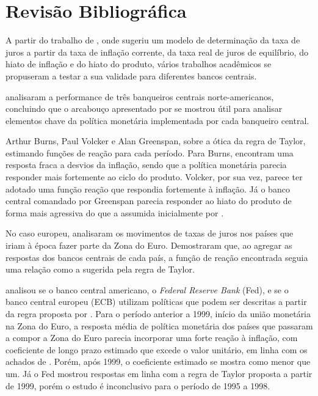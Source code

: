 \documentclass[
	article,			%
	11pt,				%
	oneside,			%
	a4paper,			%
	english,			%
	brazil,				%
	]{abntex2}
\begin{document}
	\section{Revisão Bibliográfica}
	
	A partir do trabalho de , onde sugeriu um modelo de determinação da taxa de juros a partir da taxa de inflação corrente, da taxa real de juros de equilíbrio, do hiato de inflação e do hiato do produto, vários trabalhos acadêmicos se propuseram a testar a sua validade para diferentes bancos centrais.
	
	 analisaram a performance de três banqueiros centrais norte-americanos, concluindo que o arcabouço apresentado por  se mostrou útil para analisar elementos chave da política monetária implementada por cada banqueiro central.
	
	Arthur Burns, Paul Volcker e Alan Greenspan, sobre a ótica da regra de Taylor, estimando funções de reação para cada período. Para Burns, encontram uma resposta fraca a desvios da inflação, sendo que a política monetária parecia responder mais fortemente ao ciclo do produto. Volcker, por sua vez, parece ter adotado uma função reação que respondia fortemente à inflação. Já o banco central comandado por Greenspan parecia responder ao hiato do produto de forma mais agressiva do que a assumida inicialmente por . 
	
	No caso europeu,  analisaram os movimentos de taxas de juros nos países que iriam à época fazer parte da Zona do Euro. Demostraram que, ao agregar as respostas dos bancos centrais de cada país, a função de reação encontrada seguia uma relação como a sugerida pela regra de Taylor.
	
	 analisou se o banco central americano, o \textit{Federal Reserve Bank} (Fed), e se o banco central europeu (ECB) utilizam políticas que podem ser descritas a partir da regra proposta por . Para o período anterior a 1999, início da união monetária na Zona do Euro, a resposta média de política monetária dos países que passaram a compor a Zona do Euro parecia incorporar uma forte reação à inflação, com coeficiente de longo prazo estimado que excede o valor unitário, em linha com os achados de . Porém, após 1999, o coeficiente estimado se mostra como menor que um. Já o Fed mostrou respostas em linha com a regra de Taylor proposta a partir de 1999, porém o estudo é inconclusivo para o período de 1995 a 1998.
	
\end{document}
